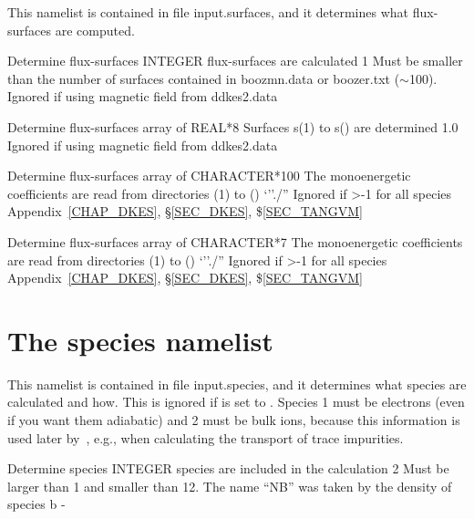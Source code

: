 This namelist is contained in file {\ttfamily input.surfaces}, and it determines what flux-surfaces are computed. 

{Determine flux-surfaces}
{INTEGER}
{ flux-surfaces are calculated}
{1}%
{Must be smaller than the number of surfaces contained in {\ttfamily boozmn.data} or {\ttfamily boozer.txt} ($\sim$100). Ignored if using magnetic field from {\ttfamily ddkes2.data}}
{}

{Determine flux-surfaces}
{array of REAL*8}
{Surfaces s(1) to s() are determined}
{1.0}%
{Ignored if using magnetic field from {\ttfamily ddkes2.data}}
{}

{Determine flux-surfaces}
{array of CHARACTER*100}
{The monoenergetic coefficients are read from directories (1) to ()}
{`''./''}
{Ignored if >-1 for all species}
{Appendix~\ref{CHAP_DKES}, \S\ref{SEC_DKES}, \$\ref{SEC_TANGVM}}
  
{Determine flux-surfaces}
{array of CHARACTER*7}
{The monoenergetic coefficients are read from directories (1) to ()}
{`''./''}
{Ignored if >-1 for all species}
{Appendix~\ref{CHAP_DKES}, \S\ref{SEC_DKES}, \$\ref{SEC_TANGVM}}



\section{The {\ttfamily species} namelist}\label{SEC_SPE}

This namelist is contained in file {\ttfamily input.species}, and it determines what species are calculated and how. This is ignored if  is set to \true. Species 1 must be electrons (even if you want them adiabatic) and 2 must be bulk ions, because this information is used later by~\KNOSOS, e.g., when calculating the transport of trace impurities. 
 

{Determine species}
{INTEGER}
{ species are included in the calculation}
{2}%
{Must be larger than 1 and smaller than 12. The name ``NB'' was taken by the density of species b}
{-}

